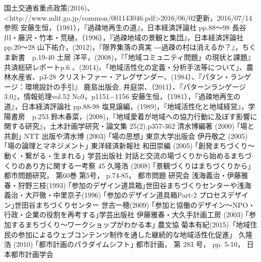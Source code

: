 \documentclass[a4paper]{jsarticle}
\begin{document}
\begin{thebibliography}{999}


国土交通省重点政策(2016)、<http://www.mlit.go.jp/common/001143046.pdf>2016/06/02更新，2016/07/14参照
安藤生恒，（1981），『過疎地再生の道』，日本経済評論社 pp.88～98
長谷川・藤沢・竹本・荒樋，（1996），『過疎地域の景観と集団』，日本経済評論社 pp.20～28
山下祐介，(2012)，『限界集落の真実 ―過疎の村は消えるか？』，ちくま新書　p.19-40
土居 洋平，(2008)，『｢地域コミュニティ問題」の現状と課題』共済総研レポートp.6
、(2014)、「地域活性化の定義・分析手法等について」、農林水産省、p3-28
クリストファー・アレグザンダー、(1984）、『パタン・ランゲージ：環境設計の手引』 鹿島出版会,
井庭崇、（2011）、『パターンランゲージ 3.0』，情報処理vol.52 No9，p1151−1156
安藤生恒，（1981），『過疎地再生の道』，日本経済評論社 pp.88-98
塩見譲編，(1989)，『地域活性化と地域経営』，学陽書房　p.253
鈴木春菜，(2008)，『地域愛着が地域への協力行動に及ぼす影響に関する研究』，土木計画学研究・論文集 25(2).p357-362
清水博編著 (2000) ｢場と共創｣ NTT 出版や清水博 (2003) ｢場の思想｣ 東京大学出版会
伊丹敬之 (2005) ｢場の論理とマネジメント｣ 東洋経済新報社
和田崇編 (2005) ｢創発まちづくり～動く・繋がる・生まれる｣ 学芸出版社 対話と交流の場づくりから始めるまちづくりのあり方に関する一考察 45
久隆浩 (2008) ｢景観づくりはまちづくりから｣ 都市問題研究， 第60巻 第5号， p.74-85， 都市問題 研究会
浅海義治・伊藤雅春・狩野三枝(1993) ｢参加のデザイン道具箱｣世田谷まちづくりセンターや浅海義治・大戸徹・中里京子(1996) ｢参加のデザイン道具箱Part-2 プロセスデザイン｣世田谷まちづくりセンター
世古一穂(2009) ｢参加と協働のデザイン～NPO・行政・企業の役割を再考する｣学芸出版社
伊藤雅春・大久手計画工房 (2003) ｢参加するまちづくり～ワークショップがわかる本｣ 農文協
菊本有紀(2015)「地域住民の参加によるウェブコンテンツ制作を通した継続的な地域活性化促進」
久隆浩 (2010) ｢都市計画のパラダイムシフト｣ 都市計画， 第 283 号， pp. 5-10， 日本都市計画学会


\end{thebibliography}

\newpage
\end{document}

